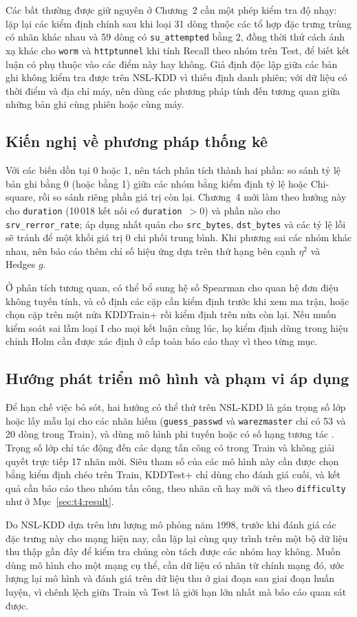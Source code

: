 \documentclass[../main.tex]{subfiles}
\begin{document}
Các bất thường được giữ nguyên ở Chương~2 cần một phép kiểm tra độ nhạy: lặp lại các kiểm định chính sau khi loại 31 dòng thuộc các tổ hợp đặc trưng trùng có nhãn khác nhau và 59 dòng có \texttt{su\_attempted} bằng 2, đồng thời thử cách ánh xạ khác cho \texttt{worm} và \texttt{httptunnel} khi tính Recall theo nhóm trên Test, để biết kết luận có phụ thuộc vào các điểm này hay không. Giả định độc lập giữa các bản ghi không kiểm tra được trên NSL-KDD vì thiếu định danh phiên; với dữ liệu có thời điểm và địa chỉ máy, nên dùng các phương pháp tính đến tương quan giữa những bản ghi cùng phiên hoặc cùng máy.

\subsection{Kiến nghị về phương pháp thống kê}
Với các biến dồn tại 0 hoặc 1, nên tách phân tích thành hai phần: so sánh tỷ lệ bản ghi bằng 0 (hoặc bằng 1) giữa các nhóm bằng kiểm định tỷ lệ hoặc Chi-square, rồi so sánh riêng phần giá trị còn lại. Chương~4 mới làm theo hướng này cho \texttt{duration} (10\,018 kết nối có \texttt{duration}~$>0$) và phần nào cho \texttt{srv\_rerror\_rate}; áp dụng nhất quán cho \texttt{src\_bytes}, \texttt{dst\_bytes} và các tỷ lệ lỗi sẽ tránh để một khối giá trị 0 chi phối trung bình. Khi phương sai các nhóm khác nhau, nên báo cáo thêm chỉ số hiệu ứng dựa trên thứ hạng bên cạnh $\eta^2$ và Hedges $g$.

Ở phân tích tương quan, có thể bổ sung hệ số Spearman cho quan hệ đơn điệu không tuyến tính, và cố định các cặp cần kiểm định trước khi xem ma trận, hoặc chọn cặp trên một nửa KDDTrain+ rồi kiểm định trên nửa còn lại. Nếu muốn kiểm soát sai lầm loại I cho mọi kết luận cùng lúc, họ kiểm định dùng trong hiệu chỉnh Holm cần được xác định ở cấp toàn báo cáo thay vì theo từng mục.

\subsection{Hướng phát triển mô hình và phạm vi áp dụng}
Để hạn chế việc bỏ sót, hai hướng có thể thử trên NSL-KDD là gán trọng số lớp hoặc lấy mẫu lại cho các nhãn hiếm (\texttt{guess\_passwd} và \texttt{warezmaster} chỉ có 53 và 20 dòng trong Train), và dùng mô hình phi tuyến hoặc có số hạng tương tác \cite{task4_hastie2009}. Trọng số lớp chỉ tác động đến các dạng tấn công có trong Train và không giải quyết trực tiếp 17 nhãn mới. Siêu tham số của các mô hình này cần được chọn bằng kiểm định chéo trên Train, KDDTest+ chỉ dùng cho đánh giá cuối, và kết quả cần báo cáo theo nhóm tấn công, theo nhãn cũ hay mới và theo \texttt{difficulty} như ở Mục~\ref{sec:t4:result}.

Do NSL-KDD dựa trên lưu lượng mô phỏng năm 1998, trước khi đánh giá các đặc trưng này cho mạng hiện nay, cần lặp lại cùng quy trình trên một bộ dữ liệu thu thập gần đây để kiểm tra chúng còn tách được các nhóm hay không. Muốn dùng mô hình cho một mạng cụ thể, cần dữ liệu có nhãn từ chính mạng đó, ước lượng lại mô hình và đánh giá trên dữ liệu thu ở giai đoạn sau giai đoạn huấn luyện, vì chênh lệch giữa Train và Test là giới hạn lớn nhất mà báo cáo quan sát được.
\end{document}
